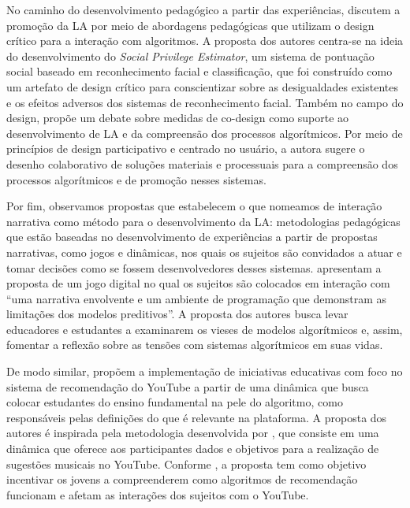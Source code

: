No caminho do desenvolvimento pedagógico a partir das experiências,
\textcite{Klumbbyte2020} discutem a promoção da LA por meio de
abordagens pedagógicas que utilizam o design crítico para a interação
com algoritmos. A proposta dos autores centra-se na ideia do
desenvolvimento do \textit{Social Privilege Estimator}, um sistema de pontuação
social baseado em reconhecimento facial e classificação, que foi
construído como um artefato de design crítico para conscientizar sobre
as desigualdades existentes e os efeitos adversos dos sistemas de
reconhecimento facial. Também no campo do design, \textcite{Cech2020} propõe um
debate sobre medidas de co-design como suporte ao desenvolvimento de LA
e da compreensão dos processos algorítmicos. Por meio de princípios de
design participativo e centrado no usuário, a autora sugere o desenho
colaborativo de soluções materiais e processuais para a compreensão dos
processos algorítmicos e de promoção nesses sistemas.

Por fim, observamos propostas que estabelecem o que nomeamos de
interação narrativa como método para o desenvolvimento da LA:
metodologias pedagógicas que estão baseadas no desenvolvimento de
experiências a partir de propostas narrativas, como jogos e dinâmicas,
nos quais os sujeitos são convidados a atuar e tomar decisões como se
fossem desenvolvedores desses sistemas. \textcite[p.~199]{Aleman2021} apresentam a proposta de um jogo digital no qual os sujeitos são
colocados em interação com ``uma narrativa envolvente e um ambiente de
programação que demonstram as limitações dos modelos preditivos''. A
proposta dos autores busca levar educadores e estudantes a examinarem os
vieses de modelos algorítmicos e, assim, fomentar a reflexão sobre as
tensões com sistemas algorítmicos em suas vidas.

De modo similar, \textcite{Jeong2022} propõem a implementação de
iniciativas educativas com foco no sistema de recomendação do YouTube a
partir de uma dinâmica que busca colocar estudantes do ensino
fundamental na pele do algoritmo, como responsáveis pelas definições do
que é relevante na plataforma. A proposta dos autores é inspirada pela
metodologia desenvolvida por \textcite{Grosman2022}, que
consiste em uma dinâmica que oferece aos participantes dados e objetivos
para a realização de sugestões musicais no YouTube. Conforme \textcite{Jeong2022}, a proposta tem como objetivo incentivar os jovens a
compreenderem como algoritmos de recomendação funcionam e afetam as
interações dos sujeitos com o YouTube.


